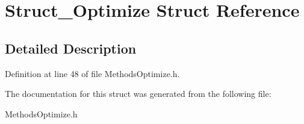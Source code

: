 \hypertarget{structStruct__Optimize}{\section{Struct\-\_\-\-Optimize Struct Reference}
\label{structStruct__Optimize}
}


\subsection{Detailed Description}


Definition at line 48 of file Methods\-Optimize.\-h.



The documentation for this struct was generated from the following file\-:\begin{DoxyCompactItemize}
\item 
Methods\-Optimize.\-h\end{DoxyCompactItemize}

